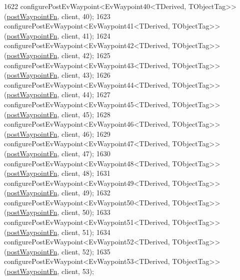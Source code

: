 \begin{DoxyCode}
1622     configurePostEvWaypoint<EvWaypoint40<TDerived, TObjectTag>>(\hyperlink{classmove__base__z__client_1_1WaypointEventDispatcher_acc538eb7506c13f7cca2268a1742dadd}{postWaypointFn}, client, 40);
1623     configurePostEvWaypoint<EvWaypoint41<TDerived, TObjectTag>>(\hyperlink{classmove__base__z__client_1_1WaypointEventDispatcher_acc538eb7506c13f7cca2268a1742dadd}{postWaypointFn}, client, 41);
1624     configurePostEvWaypoint<EvWaypoint42<TDerived, TObjectTag>>(\hyperlink{classmove__base__z__client_1_1WaypointEventDispatcher_acc538eb7506c13f7cca2268a1742dadd}{postWaypointFn}, client, 42);
1625     configurePostEvWaypoint<EvWaypoint43<TDerived, TObjectTag>>(\hyperlink{classmove__base__z__client_1_1WaypointEventDispatcher_acc538eb7506c13f7cca2268a1742dadd}{postWaypointFn}, client, 43);
1626     configurePostEvWaypoint<EvWaypoint44<TDerived, TObjectTag>>(\hyperlink{classmove__base__z__client_1_1WaypointEventDispatcher_acc538eb7506c13f7cca2268a1742dadd}{postWaypointFn}, client, 44);
1627     configurePostEvWaypoint<EvWaypoint45<TDerived, TObjectTag>>(\hyperlink{classmove__base__z__client_1_1WaypointEventDispatcher_acc538eb7506c13f7cca2268a1742dadd}{postWaypointFn}, client, 45);
1628     configurePostEvWaypoint<EvWaypoint46<TDerived, TObjectTag>>(\hyperlink{classmove__base__z__client_1_1WaypointEventDispatcher_acc538eb7506c13f7cca2268a1742dadd}{postWaypointFn}, client, 46);
1629     configurePostEvWaypoint<EvWaypoint47<TDerived, TObjectTag>>(\hyperlink{classmove__base__z__client_1_1WaypointEventDispatcher_acc538eb7506c13f7cca2268a1742dadd}{postWaypointFn}, client, 47);
1630     configurePostEvWaypoint<EvWaypoint48<TDerived, TObjectTag>>(\hyperlink{classmove__base__z__client_1_1WaypointEventDispatcher_acc538eb7506c13f7cca2268a1742dadd}{postWaypointFn}, client, 48);
1631     configurePostEvWaypoint<EvWaypoint49<TDerived, TObjectTag>>(\hyperlink{classmove__base__z__client_1_1WaypointEventDispatcher_acc538eb7506c13f7cca2268a1742dadd}{postWaypointFn}, client, 49);
1632     configurePostEvWaypoint<EvWaypoint50<TDerived, TObjectTag>>(\hyperlink{classmove__base__z__client_1_1WaypointEventDispatcher_acc538eb7506c13f7cca2268a1742dadd}{postWaypointFn}, client, 50);
1633     configurePostEvWaypoint<EvWaypoint51<TDerived, TObjectTag>>(\hyperlink{classmove__base__z__client_1_1WaypointEventDispatcher_acc538eb7506c13f7cca2268a1742dadd}{postWaypointFn}, client, 51);
1634     configurePostEvWaypoint<EvWaypoint52<TDerived, TObjectTag>>(\hyperlink{classmove__base__z__client_1_1WaypointEventDispatcher_acc538eb7506c13f7cca2268a1742dadd}{postWaypointFn}, client, 52);
1635     configurePostEvWaypoint<EvWaypoint53<TDerived, TObjectTag>>(\hyperlink{classmove__base__z__client_1_1WaypointEventDispatcher_acc538eb7506c13f7cca2268a1742dadd}{postWaypointFn}, client, 53);

\end{DoxyCode}

